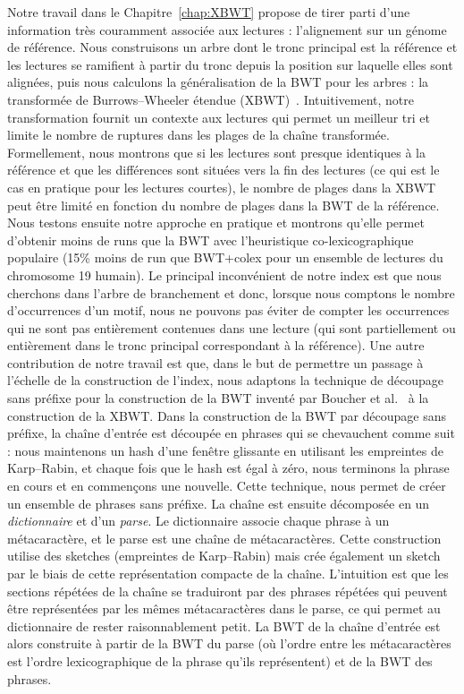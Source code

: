 Notre travail dans le Chapitre~\ref{chap:XBWT} propose de tirer parti d'une information très couramment associée aux lectures : l'alignement sur un génome de référence. Nous construisons un arbre dont le tronc principal est la référence et les lectures se ramifient à partir du tronc depuis la position sur laquelle elles sont alignées, puis nous calculons la généralisation de la BWT pour les arbres : la transformée de Burrows--Wheeler étendue (XBWT)~\cite{ferragina2009compressing}. Intuitivement, notre transformation fournit un contexte aux lectures qui permet un meilleur tri et limite le nombre de ruptures dans les plages de la chaîne transformée. Formellement, nous montrons que si les lectures sont presque identiques à la référence et que les différences sont situées vers la fin des lectures (ce qui est le cas en pratique pour les lectures courtes), le nombre de plages dans la XBWT peut être limité en fonction du nombre de plages dans la BWT de la référence. Nous testons ensuite notre approche en pratique et montrons qu'elle permet d'obtenir moins de runs que la BWT avec l'heuristique co-lexicographique populaire (15\% moins de run que BWT+colex pour un ensemble de lectures du chromosome 19 humain).
Le principal inconvénient de notre index est que nous cherchons dans l'arbre de branchement et donc, lorsque nous comptons le nombre d'occurrences d'un motif, nous ne pouvons pas éviter de compter les occurrences qui ne sont pas entièrement contenues dans une lecture (qui sont partiellement ou entièrement dans le tronc principal correspondant à la référence).
%
Une autre contribution de notre travail est que, dans le but de permettre un passage à l'échelle de la construction de l'index, nous adaptons la technique de découpage sans préfixe pour la construction de la BWT inventé par Boucher et al.~\cite{boucher2019prefix} à la construction de la XBWT. 
%
Dans la construction de la BWT par découpage sans préfixe, la chaîne d'entrée est découpée en phrases qui se chevauchent comme suit : nous maintenons un hash d'une fenêtre glissante en utilisant les empreintes de Karp--Rabin, et chaque fois que le hash est égal à zéro, nous terminons la phrase en cours et en commençons une nouvelle. Cette technique, nous permet de créer un ensemble de phrases sans préfixe.
La chaîne est ensuite décomposée en un \emph{dictionnaire} et d'un \emph{parse}. 
Le dictionnaire associe chaque phrase à un métacaractère, et le parse est une chaîne de métacaractères.
Cette construction utilise des sketches (empreintes de Karp--Rabin) mais crée également un sketch par le biais de cette représentation compacte de la chaîne.
L'intuition est que les sections répétées de la chaîne se traduiront par des phrases répétées qui peuvent être représentées par les mêmes métacaractères dans le parse, ce qui permet au dictionnaire de rester raisonnablement petit.
La BWT de la chaîne d'entrée est alors construite à partir de la BWT du parse (où l'ordre entre les métacaractères est l'ordre lexicographique de la phrase qu'ils représentent) et de la BWT des phrases.


